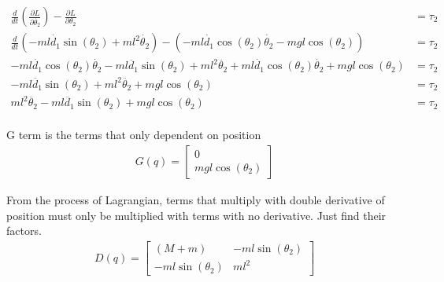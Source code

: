 \begin{solutionbox}[Q1-4]
    \begin{align*}
        \frac{d}{dt}\left(\frac{\partial L}{\partial \dot{\theta_2}}\right) - \frac{\partial L}{\partial \theta_2}                                              & = \tau_2 \\
        \frac{d}{dt}\left(-ml\dot{d_1}\sin(\theta_2)+ ml^2\dot{\theta_2} \right) - \left(-ml\dot{d_1}\cos(\theta_2)\dot{\theta_2} - mgl\cos(\theta_2)\right)    & = \tau_2 \\
        -ml\dot{d_1}\cos(\theta_2)\dot{\theta_2}-ml\ddot{d_1}\sin(\theta_2)+ ml^2\ddot{\theta_2}  + ml\dot{d_1}\cos(\theta_2)\dot{\theta_2} + mgl\cos(\theta_2) & = \tau_2 \\
        -ml\ddot{d_1}\sin(\theta_2)+ ml^2\ddot{\theta_2} + mgl\cos(\theta_2)                                                                                    & = \tau_2 \\
        ml^2\ddot{\theta_2}-ml\ddot{d_1}\sin(\theta_2) + mgl\cos(\theta_2)                                                                                      & = \tau_2 \\
    \end{align*}

\end{solutionbox}

\begin{solutionbox}[Q1-5]
    G term is the terms that only dependent on position
    \begin{align*}
        G(q) = \begin{bmatrix}
                   0 \\
                   mgl\cos(\theta_2)
               \end{bmatrix}
    \end{align*}

    From the process of Lagrangian, terms that multiply with double derivative of position must only be multiplied with terms with no derivative. Just find their factors.
    \begin{align*}
        D(q) = \begin{bmatrix}
                   (M+m)             & -ml\sin(\theta_2) \\
                   -ml\sin(\theta_2) & ml^2
               \end{bmatrix}
    \end{align*}
\end{solutionbox}

